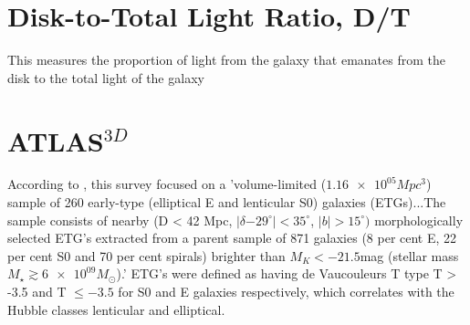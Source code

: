 \section{Disk-to-Total Light Ratio, D/T}
This measures the proportion of light from the galaxy that emanates from the disk to the total light of the galaxy

\section{ATLAS$^{3D}$}
According to \cite{Cappellari2011}, this survey focused on a 'volume-limited ($\num{1.16e05} Mpc^{3}$) sample of 260 early-type (elliptical E and lenticular S0) galaxies (ETGs)...The sample consists of nearby (D < 42 Mpc, $|\delta \num{-29}^{\circ}| < 35^{\circ}$, $|b| > 15^{\circ})$ morphologically selected ETG's extracted from a parent sample of 871 galaxies (8 per cent E, 22 per cent S0 and
70 per cent spirals) brighter than $M_{K} <\num{-21.5} $mag (stellar mass $M_{\star} \gtrsim \num{6e09} M_{\odot}$).' ETG's were defined as having de Vaucouleurs T type T > -3.5 and T $\leq -3.5$ for S0 and E galaxies respectively, which correlates with the Hubble classes lenticular and elliptical.


